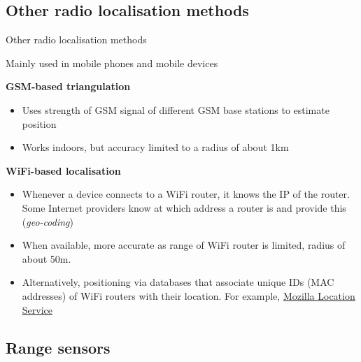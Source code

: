 \documentclass[compress]{beamer}
\begin{document}
\subsection{Other radio localisation methods}

\begin{frame}{Other radio localisation methods}

    Mainly used in mobile phones and mobile devices

    \textbf{GSM-based triangulation}

    \begin{itemize}

        \item
              Uses strength of GSM signal of different GSM base stations to estimate
              position
        \item
              Works indoors, but accuracy limited to a radius of about 1km
    \end{itemize}

    \pause

    \textbf{WiFi-based localisation}

    \begin{itemize}
        \item
              Whenever a device connects to a WiFi router, it knows the IP of the
              router. Some Internet providers know at which address a router is and
              provide this (\emph{geo-coding})
        \item When available, more accurate as range of WiFi router is limited, radius of about 50m.
        \item Alternatively, positioning via databases that associate unique IDs (MAC
              addresses) of WiFi routers with their location. For example,
              \href{https://location.services.mozilla.com/}{Mozilla Location Service}

    \end{itemize}

\end{frame}


\subsection{Range sensors}
\end{document}
